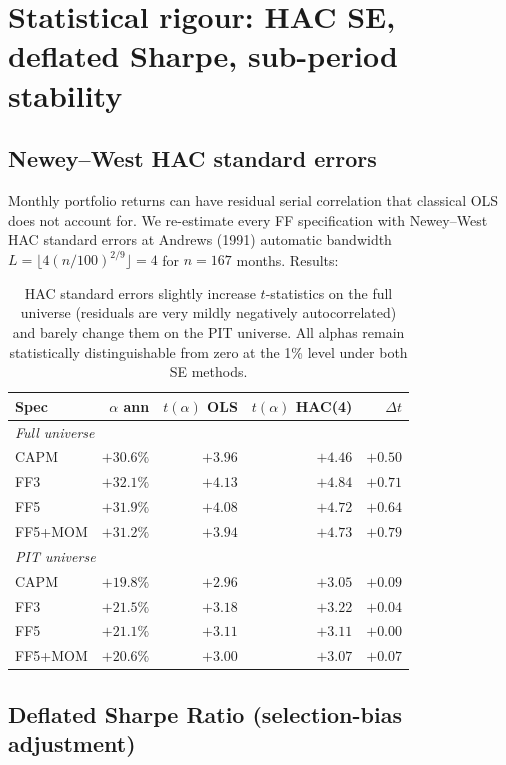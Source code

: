 \documentclass[11pt]{article}
\begin{document}
\section{Statistical rigour: HAC SE, deflated Sharpe, sub-period stability}
\label{sec:rigour}

\subsection{Newey--West HAC standard errors}

Monthly portfolio returns can have residual serial correlation that
classical OLS does not account for. We re-estimate every FF specification
with Newey--West HAC standard errors at Andrews (1991) automatic bandwidth
$L = \lfloor 4 (n/100)^{2/9} \rfloor = 4$ for $n = 167$ months. Results:

\begin{table}[h]
\centering
\begin{tabular}{lrrrr}
\toprule
Spec & $\alpha$ ann & $t(\alpha)$ OLS & $t(\alpha)$ HAC(4) & $\Delta t$ \\
\midrule
\multicolumn{5}{l}{\emph{Full universe}} \\
CAPM     & $+30.6\%$ & $+3.96$ & $+4.46$ & $+0.50$ \\
FF3      & $+32.1\%$ & $+4.13$ & $+4.84$ & $+0.71$ \\
FF5      & $+31.9\%$ & $+4.08$ & $+4.72$ & $+0.64$ \\
FF5+MOM  & $+31.2\%$ & $+3.94$ & $+4.73$ & $+0.79$ \\
\midrule
\multicolumn{5}{l}{\emph{PIT universe}} \\
CAPM     & $+19.8\%$ & $+2.96$ & $+3.05$ & $+0.09$ \\
FF3      & $+21.5\%$ & $+3.18$ & $+3.22$ & $+0.04$ \\
FF5      & $+21.1\%$ & $+3.11$ & $+3.11$ & $+0.00$ \\
FF5+MOM  & $+20.6\%$ & $+3.00$ & $+3.07$ & $+0.07$ \\
\bottomrule
\end{tabular}
\caption{HAC standard errors slightly increase $t$-statistics on the full
  universe (residuals are very mildly negatively autocorrelated) and barely
  change them on the PIT universe. All alphas remain statistically
  distinguishable from zero at the 1\% level under both SE methods.}
\label{tab:hac}
\end{table}

\subsection{Deflated Sharpe Ratio (selection-bias adjustment)}
\end{document}
